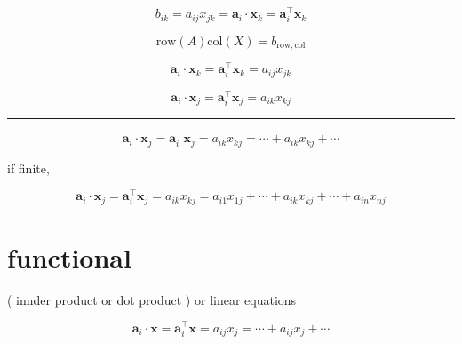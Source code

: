 \documentclass[
]{book}
\theoremstyle{definition}
\theoremstyle{definition}
\theoremstyle{definition}
\theoremstyle{definition}
\theoremstyle{remark}
\begin{document}
\[
b_{{\scriptscriptstyle ik}}=a_{{\scriptscriptstyle ij}}x_{{\scriptscriptstyle jk}}=\boldsymbol{a}_{{\scriptscriptstyle i}}\cdot\boldsymbol{x}_{{\scriptscriptstyle k}}=\boldsymbol{a}_{{\scriptscriptstyle i}}^{\intercal}\boldsymbol{x}_{{\scriptscriptstyle k}}
\]

\[
\mathrm{row}\left(A\right)\mathrm{col}\left(X\right)=b_{\mathrm{row},\mathrm{col}}
\]

\[
\boldsymbol{a}_{{\scriptscriptstyle i}}\cdot\boldsymbol{x}_{{\scriptscriptstyle k}}=\boldsymbol{a}_{{\scriptscriptstyle i}}^{\intercal}\boldsymbol{x}_{{\scriptscriptstyle k}}=a_{{\scriptscriptstyle ij}}x_{{\scriptscriptstyle jk}}
\]

\[
\boldsymbol{a}_{{\scriptscriptstyle i}}\cdot\boldsymbol{x}_{{\scriptscriptstyle j}}=\boldsymbol{a}_{{\scriptscriptstyle i}}^{\intercal}\boldsymbol{x}_{{\scriptscriptstyle j}}=a_{{\scriptscriptstyle ik}}x_{{\scriptscriptstyle kj}}
\]

\begin{center}\rule{0.5\linewidth}{0.5pt}\end{center}

\[
\boldsymbol{a}_{{\scriptscriptstyle i}}\cdot\boldsymbol{x}_{{\scriptscriptstyle j}}=\boldsymbol{a}_{{\scriptscriptstyle i}}^{\intercal}\boldsymbol{x}_{{\scriptscriptstyle j}}=a_{{\scriptscriptstyle ik}}x_{{\scriptscriptstyle kj}}=\cdots+a_{{\scriptscriptstyle ik}}x_{{\scriptscriptstyle kj}}+\cdots
\]

if finite,

\[
\boldsymbol{a}_{{\scriptscriptstyle i}}\cdot\boldsymbol{x}_{{\scriptscriptstyle j}}=\boldsymbol{a}_{{\scriptscriptstyle i}}^{\intercal}\boldsymbol{x}_{{\scriptscriptstyle j}}=a_{{\scriptscriptstyle ik}}x_{{\scriptscriptstyle kj}}=a_{{\scriptscriptstyle i1}}x_{{\scriptscriptstyle 1j}}+\cdots+a_{{\scriptscriptstyle ik}}x_{{\scriptscriptstyle kj}}+\cdots+a_{{\scriptscriptstyle in}}x_{{\scriptscriptstyle nj}}
\]

\section{functional}\label{functional}

( innder product or dot product ) or linear equations

\[
\boldsymbol{a}_{{\scriptscriptstyle i}}\cdot\boldsymbol{x}=\boldsymbol{a}_{{\scriptscriptstyle i}}^{\intercal}\boldsymbol{x}=a_{{\scriptscriptstyle ij}}x_{{\scriptscriptstyle j}}=\cdots+a_{{\scriptscriptstyle ij}}x_{{\scriptscriptstyle j}}+\cdots
\]
\end{document}
